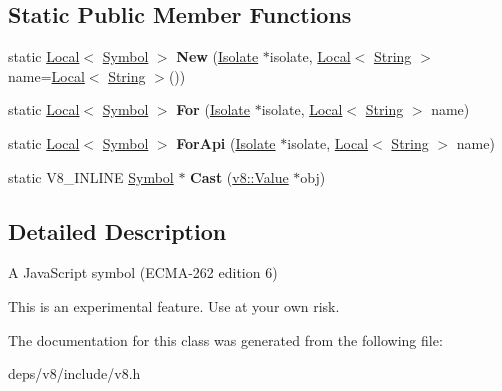 \subsection*{Static Public Member Functions}
\begin{DoxyCompactItemize}
\item 
\hypertarget{classv8_1_1_symbol_add1f6084974464105b56595d34c14ab9}{}static \hyperlink{classv8_1_1_local}{Local}$<$ \hyperlink{classv8_1_1_symbol}{Symbol} $>$ {\bfseries New} (\hyperlink{classv8_1_1_isolate}{Isolate} $\ast$isolate, \hyperlink{classv8_1_1_local}{Local}$<$ \hyperlink{classv8_1_1_string}{String} $>$ name=\hyperlink{classv8_1_1_local}{Local}$<$ \hyperlink{classv8_1_1_string}{String} $>$())\label{classv8_1_1_symbol_add1f6084974464105b56595d34c14ab9}

\item 
\hypertarget{classv8_1_1_symbol_a8a4a6bdc7d3e31c71cf48fa5cb811fc8}{}static \hyperlink{classv8_1_1_local}{Local}$<$ \hyperlink{classv8_1_1_symbol}{Symbol} $>$ {\bfseries For} (\hyperlink{classv8_1_1_isolate}{Isolate} $\ast$isolate, \hyperlink{classv8_1_1_local}{Local}$<$ \hyperlink{classv8_1_1_string}{String} $>$ name)\label{classv8_1_1_symbol_a8a4a6bdc7d3e31c71cf48fa5cb811fc8}

\item 
\hypertarget{classv8_1_1_symbol_ac3937f0b0b831c4be495a399f26d7301}{}static \hyperlink{classv8_1_1_local}{Local}$<$ \hyperlink{classv8_1_1_symbol}{Symbol} $>$ {\bfseries For\+Api} (\hyperlink{classv8_1_1_isolate}{Isolate} $\ast$isolate, \hyperlink{classv8_1_1_local}{Local}$<$ \hyperlink{classv8_1_1_string}{String} $>$ name)\label{classv8_1_1_symbol_ac3937f0b0b831c4be495a399f26d7301}

\item 
\hypertarget{classv8_1_1_symbol_a6bb214df5e2d8655379a648530aebaf1}{}static V8\+\_\+\+I\+N\+L\+I\+N\+E \hyperlink{classv8_1_1_symbol}{Symbol} $\ast$ {\bfseries Cast} (\hyperlink{classv8_1_1_value}{v8\+::\+Value} $\ast$obj)\label{classv8_1_1_symbol_a6bb214df5e2d8655379a648530aebaf1}

\end{DoxyCompactItemize}


\subsection{Detailed Description}
A Java\+Script symbol (E\+C\+M\+A-\/262 edition 6)

This is an experimental feature. Use at your own risk. 

The documentation for this class was generated from the following file\+:\begin{DoxyCompactItemize}
\item 
deps/v8/include/v8.\+h\end{DoxyCompactItemize}
